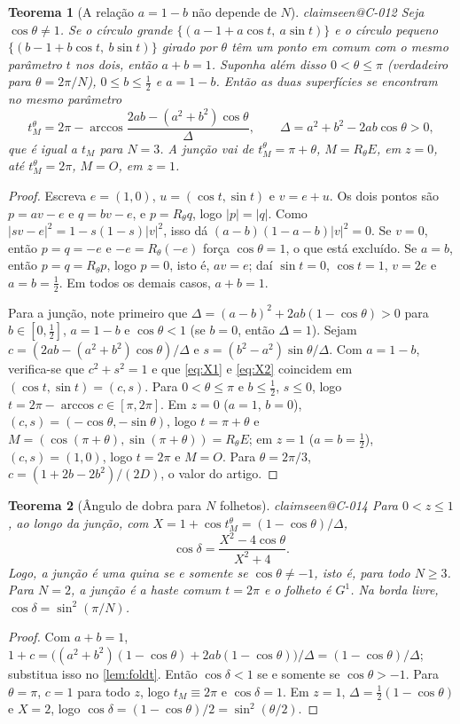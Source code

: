 \documentclass[11pt,a4paper]{article}
\makeatletter
\theoremstyle{plain}
\newtheorem{theorem}{Teorema}[section]
\theoremstyle{remark}
\newcommand{\claim}[1]{\ifcsname claimseen@#1\endcsname\else\expandafter\gdef\csname claimseen@#1\endcsname{}\label{claim:#1}\fi}
\makeatother
\begin{document}
\begin{theorem}[A relação $a=1-b$ não depende de $N$]\label{thm:aplusb}\claim{C-012}
Seja $\cos\theta\ne1$. Se o círculo grande $\{(a-1+a\cos t,\ a\sin t)\}$ e o círculo pequeno $\{(b-1+b\cos t,\ b\sin t)\}$
girado por $\theta$ têm um ponto em comum com o mesmo parâmetro $t$ nos dois, então $a+b=1$. Suponha além disso $0<\theta\le\pi$
(verdadeiro para $\theta=2\pi/N$), $0\le b\le\frac12$ e $a=1-b$. Então as duas superfícies se encontram no mesmo parâmetro
\[ t_M^\theta=2\pi-\arccos\frac{2ab-(a^2+b^2)\cos\theta}{\Delta},\qquad \Delta=a^2+b^2-2ab\cos\theta>0, \]
que é igual a $t_M$ para $N=3$. A junção vai de $t_M^\theta=\pi+\theta$, $M=R_\theta E$, em $z=0$, até $t_M^\theta=2\pi$, $M=O$, em $z=1$.
\end{theorem}
\begin{proof}
Escreva $e=(1,0)$, $u=(\cos t,\sin t)$ e $v=e+u$. Os dois pontos são $p=av-e$ e $q=bv-e$, e $p=R_\theta q$, logo $|p|=|q|$.
Como $|sv-e|^2=1-s(1-s)|v|^2$, isso dá $(a-b)(1-a-b)|v|^2=0$. Se $v=0$, então $p=q=-e$ e $-e=R_\theta(-e)$ força
$\cos\theta=1$, o que está excluído. Se $a=b$, então $p=q=R_\theta p$, logo $p=0$, isto é, $av=e$; daí $\sin t=0$,
$\cos t=1$, $v=2e$ e $a=b=\frac12$. Em todos os demais casos, $a+b=1$.

Para a junção, note primeiro que $\Delta=(a-b)^2+2ab(1-\cos\theta)>0$ para $b\in[0,\frac12]$, $a=1-b$ e
$\cos\theta<1$ (se $b=0$, então $\Delta=1$). Sejam $c=(2ab-(a^2+b^2)\cos\theta)/\Delta$ e $s=(b^2-a^2)\sin\theta/\Delta$. Com $a=1-b$, verifica-se que
$c^2+s^2=1$ e que \eqref{eq:X1} e \eqref{eq:X2} coincidem em $(\cos t,\sin t)=(c,s)$. Para $0<\theta\le\pi$ e $b\le\frac12$,
$s\le0$, logo $t=2\pi-\arccos c\in[\pi,2\pi]$. Em $z=0$ ($a=1$, $b=0$), $(c,s)=(-\cos\theta,-\sin\theta)$, logo $t=\pi+\theta$
e $M=(\cos(\pi+\theta),\sin(\pi+\theta))=R_\theta E$; em $z=1$ ($a=b=\frac12$), $(c,s)=(1,0)$, logo $t=2\pi$ e $M=O$. Para
$\theta=2\pi/3$, $c=(1+2b-2b^2)/(2D)$, o valor do artigo.
\end{proof}

\begin{theorem}[Ângulo de dobra para $N$ folhetos]\label{thm:foldN}\claim{C-014}
Para $0<z\le1$, ao longo da junção, com $X=1+\cos t_M^\theta=(1-\cos\theta)/\Delta$,
\[ \cos\delta=\frac{X^2-4\cos\theta}{X^2+4}. \]
Logo, a junção é uma quina se e somente se $\cos\theta\ne-1$, isto é, para todo $N\ge3$. Para $N=2$, a junção é a haste comum
$t=2\pi$ e o folheto é $G^1$. Na borda livre, $\cos\delta=\sin^2(\pi/N)$.
\end{theorem}
\begin{proof}
Com $a+b=1$, $1+c=\big((a^2+b^2)(1-\cos\theta)+2ab(1-\cos\theta)\big)/\Delta=(1-\cos\theta)/\Delta$; substitua isso no
\cref{lem:foldt}. Então $\cos\delta<1$ se e somente se $\cos\theta>-1$. Para $\theta=\pi$, $c=1$ para todo $z$, logo
$t_M\equiv2\pi$ e $\cos\delta=1$. Em $z=1$, $\Delta=\frac12(1-\cos\theta)$ e $X=2$, logo
$\cos\delta=(1-\cos\theta)/2=\sin^2(\theta/2)$.
\end{proof}
\end{document}
